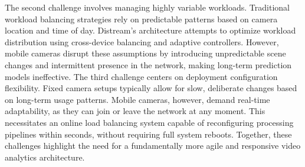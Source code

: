 The second challenge involves managing highly variable workloads. Traditional workload balancing strategies rely on predictable patterns based on camera location and time of day. Distream's architecture attempts to optimize workload distribution using cross-device balancing and adaptive controllers. However, mobile cameras disrupt these assumptions by introducing unpredictable scene changes and intermittent presence in the network, making long-term prediction models ineffective. The third challenge centers on deployment configuration flexibility. Fixed camera setups typically allow for slow, deliberate changes based on long-term usage patterns. Mobile cameras, however, demand real-time adaptability, as they can join or leave the network at any moment. This necessitates an online load balancing system capable of reconfiguring processing pipelines within seconds, without requiring full system reboots. Together, these challenges highlight the need for a fundamentally more agile and responsive video analytics architecture.




